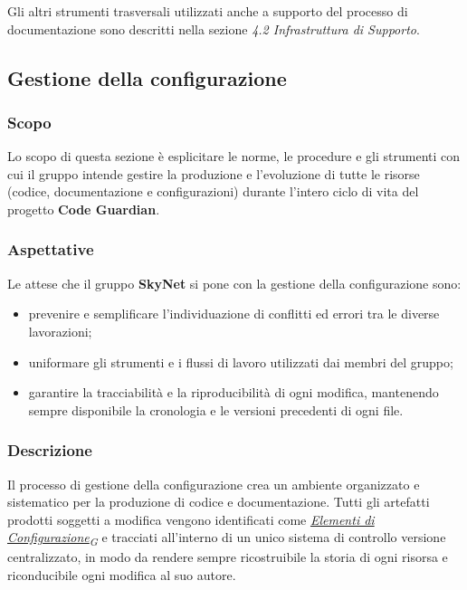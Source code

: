 \documentclass[12pt, a4paper]{article}
\newcommand{\urlglossario}{https://skynetunigroup.github.io/Code_Guardian/Documentazione/RTB/glossario_v1.0.0.pdf} %
\newcommand{\glo}[2]{\href{\urlglossario\#nameddest=#2}{#1\textsubscript{G}}}
\begin{document}
Gli altri strumenti trasversali utilizzati anche a supporto del processo di documentazione sono descritti nella sezione \textit{4.2 Infrastruttura di Supporto}.

\subsection{Gestione della configurazione}

\subsubsection{Scopo}
Lo scopo di questa sezione è esplicitare le norme, le procedure e gli strumenti con cui il gruppo intende gestire la produzione e l'evoluzione di tutte le risorse (codice, documentazione e configurazioni) durante l'intero ciclo di vita del progetto \textbf{Code Guardian}.

\subsubsection{Aspettative}
Le attese che il gruppo \textbf{SkyNet} si pone con la gestione della configurazione sono:
\begin{itemize}
    \item prevenire e semplificare l'individuazione di conflitti ed errori tra le diverse lavorazioni;
    \item uniformare gli strumenti e i flussi di lavoro utilizzati dai membri del gruppo;
    \item garantire la tracciabilità e la riproducibilità di ogni modifica, mantenendo sempre disponibile la cronologia e le versioni precedenti di ogni file.
\end{itemize}

\subsubsection{Descrizione}
Il processo di gestione della configurazione crea un ambiente organizzato e sistematico per la produzione di codice e documentazione. Tutti gli artefatti prodotti soggetti a modifica vengono identificati come \textit{\glo{Elementi di Configurazione}{elementi-configurazione}} e tracciati all'interno di un unico sistema di controllo versione centralizzato, in modo da rendere sempre ricostruibile la storia di ogni risorsa e riconducibile ogni modifica al suo autore.
\end{document}
